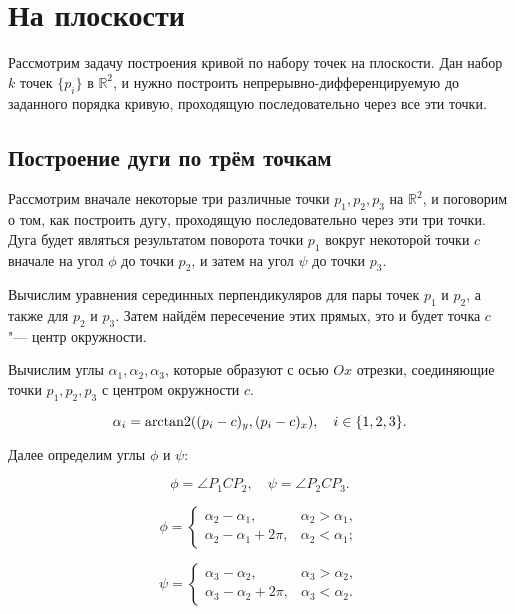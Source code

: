 \section{На плоскости}

Рассмотрим задачу построения кривой по набору точек на плоскости. Дан набор $k$ точек $\{p_i\}$ в $\mathbb{R}^2$, и
нужно построить непрерывно-дифференцируемую до заданного порядка кривую, проходящую последовательно через все эти
точки.

\subsection*{Построение дуги по трём точкам}

Рассмотрим вначале некоторые три различные точки $p_1, p_2, p_3$ на $\mathbb{R}^2$, и поговорим о том, как построить
дугу, проходящую последовательно через эти три точки. Дуга будет являться результатом поворота точки $p_1$ вокруг
некоторой точки $c$ вначале на угол $\phi$ до точки $p_2$, и затем на угол $\psi$ до точки $p_3$.

Вычислим уравнения серединных перпендикуляров для пары точек $p_1$ и $p_2$, а также для $p_2$ и $p_3$. Затем найдём
пересечение этих прямых, это и будет точка $c$ "--- центр окружности.

Вычислим углы $\alpha_1,\alpha_2,\alpha_3$, которые образуют с осью $Ox$ отрезки, соединяющие точки $p_1, p_2, p_3$ с
центром окружности $c$.

$$
\alpha_i=\operatorname{arctan2}((p_i-c)_y,(p_i-c)_x), \quad i \in \{1,2,3\}.
$$

Далее определим углы $\phi$ и $\psi$:

$$
\phi=\angle P_1CP_2, \quad \psi=\angle P_2CP_3.
$$

\begin{equation}
\phi=
  \begin{cases}
    \alpha_2-\alpha_1,      & \alpha_2>\alpha_1, \\
    \alpha_2-\alpha_1+2\pi, & \alpha_2<\alpha_1;
  \end{cases}
  \label{plane-phi}
\end{equation}

\begin{equation}
\psi=
  \begin{cases}
    \alpha_3-\alpha_2,      & \alpha_3>\alpha_2, \\
    \alpha_3-\alpha_2+2\pi, & \alpha_3<\alpha_2.
  \end{cases}
  \label{plane-psi}
\end{equation}

